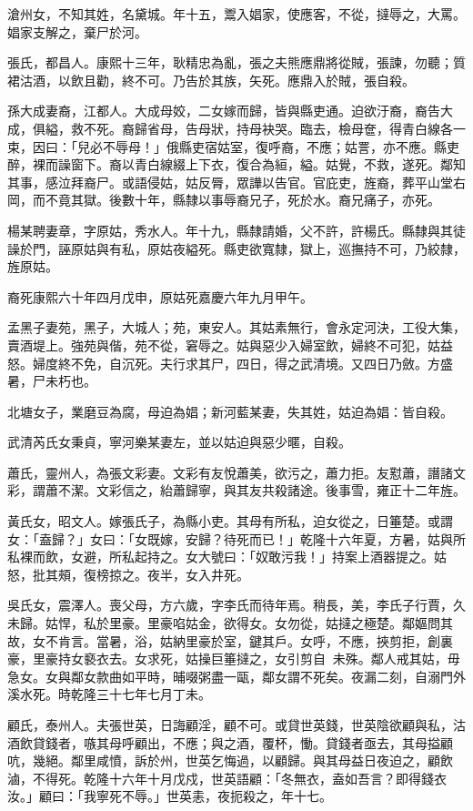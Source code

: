 \begin{pinyinscope}
滄州女，不知其姓，名黛城。年十五，鬻入娼家，使應客，不從，撻辱之，大罵。娼家支解之，棄尸於河。

張氏，都昌人。康熙十三年，耿精忠為亂，張之夫熊應鼎將從賊，張諫，勿聽；質裙沽酒，以飲且勸，終不可。乃告於其族，矢死。應鼎入於賊，張自殺。

孫大成妻裔，江都人。大成母姣，二女嫁而歸，皆與縣吏通。迫欲汙裔，裔告大成，俱縊，救不死。裔歸省母，告母狀，持母袂哭。臨去，檢母奩，得青白線各一束，因曰：「兒必不辱母！」俄縣吏宿姑室，復呼裔，不應；姑詈，亦不應。縣吏醉，裸而譟窗下。裔以青白線綴上下衣，復合為絙，縊。姑覺，不救，遂死。鄰知其事，感泣拜裔尸。或語侵姑，姑反脣，眾譁以告官。官庇吏，旌裔，葬平山堂右岡，而不竟其獄。後數十年，縣隸以事辱裔兄子，死於水。裔兄痛子，亦死。

楊某聘妻章，字原姑，秀水人。年十九，縣隸請婚，父不許，許楊氏。縣隸與其徒譟於門，誣原姑與有私，原姑夜縊死。縣吏欲寬隸，獄上，巡撫持不可，乃絞隸，旌原姑。

裔死康熙六十年四月戊申，原姑死嘉慶六年九月甲午。

孟黑子妻苑，黑子，大城人；苑，東安人。其姑素無行，會永定河決，工役大集，賣酒堤上。強苑與偕，苑不從，窘辱之。姑與惡少入婦室飲，婦終不可犯，姑益怒。婦度終不免，自沉死。夫行求其尸，四日，得之武清境。又四日乃斂。方盛暑，尸未朽也。

北塘女子，業磨豆為腐，母迫為娼；新河藍某妻，失其姓，姑迫為娼：皆自殺。

武清芮氏女秉貞，寧河樂某妻左，並以姑迫與惡少暱，自殺。

蕭氏，靈州人，為張文彩妻。文彩有友悅蕭美，欲污之，蕭力拒。友懟蕭，譖諸文彩，謂蕭不潔。文彩信之，紿蕭歸寧，與其友共殺諸途。後事雪，雍正十二年旌。

黃氏女，昭文人。嫁張氏子，為縣小吏。其母有所私，迫女從之，日箠楚。或謂女：「盍歸？」女曰：「女既嫁，安歸？待死而已！」乾隆十六年夏，方暑，姑與所私裸而飲，女避，所私起持之。女大號曰：「奴敢污我！」持案上酒器提之。姑怒，批其頰，復榜掠之。夜半，女入井死。

吳氏女，震澤人。喪父母，方六歲，字李氏而待年焉。稍長，美，李氏子行賈，久未歸。姑悍，私於里豪。里豪啗姑金，欲得女。女勿從，姑撻之極楚。鄰嫗問其故，女不肯言。當暑，浴，姑納里豪於室，鍵其戶。女呼，不應，挾剪拒，創裏豪，里豪持女褻衣去。女求死，姑操巨箠撻之，女引剪自，未殊。鄰人戒其姑，毋急女。女與鄰女款曲如平時，晡啜粥盡一甌，鄰女謂不死矣。夜漏二刻，自溺門外溪水死。時乾隆三十七年七月丁未。

顧氏，泰州人。夫張世英，日誨顧淫，顧不可。或貸世英錢，世英陰欲顧與私，沽酒飲貸錢者，嗾其母呼顧出，不應；與之酒，覆杯，慟。貸錢者亟去，其母搤顧吭，幾絕。鄰里咸憤，訴於州，世英乞悔過，以顧歸。與其母益日夜迫之，顧飲滷，不得死。乾隆十六年十月戊戍，世英語顧：「冬無衣，盍如吾言？即得錢衣汝。」顧曰：「我寧死不辱。」世英恚，夜扼殺之，年十七。


\end{pinyinscope}
